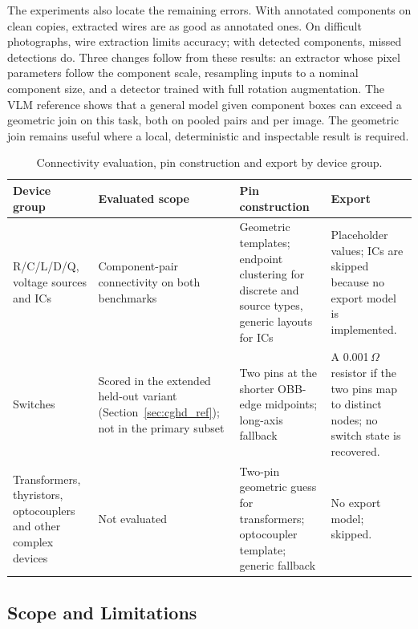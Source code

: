 \documentclass{ieeeaccess}
\begin{document}
The experiments also locate the remaining errors. With annotated components on clean copies, extracted wires are as good as annotated ones. On difficult photographs, wire extraction limits accuracy; with detected components, missed detections do. Three changes follow from these results: an extractor whose pixel parameters follow the component scale, resampling inputs to a nominal component size, and a detector trained with full rotation augmentation. The VLM reference shows that a general model given component boxes can exceed a geometric join on this task, both on pooled pairs and per image. The geometric join remains useful where a local, deterministic and inspectable result is required.

\begin{table}[t]
\caption{Connectivity evaluation, pin construction and export by device group.}
\label{tab:capabilities}
\centering
\footnotesize
\begin{tabular}{p{}p{}p{}p{}}
\toprule
\textbf{Device group} & \textbf{Evaluated scope} & \textbf{Pin construction} & \textbf{Export} \\
\midrule
R/C/L/D/Q, voltage sources and ICs & Component-pair connectivity on both benchmarks & Geometric templates; endpoint clustering for discrete and source types, generic layouts for ICs & Placeholder values; ICs are skipped because no export model is implemented. \\
Switches & Scored in the extended held-out variant (Section~\ref{sec:cghd_ref}); not in the primary subset & Two pins at the shorter OBB-edge midpoints; long-axis fallback & A 0.001\,$\Omega$ resistor if the two pins map to distinct nodes; no switch state is recovered. \\
Transformers, thyristors, optocouplers and other complex devices & Not evaluated & Two-pin geometric guess for transformers; optocoupler template; generic fallback & No export model; skipped. \\
\bottomrule
\end{tabular}
\end{table}

\subsection{Scope and Limitations}
\label{sec:limitations}
\end{document}
